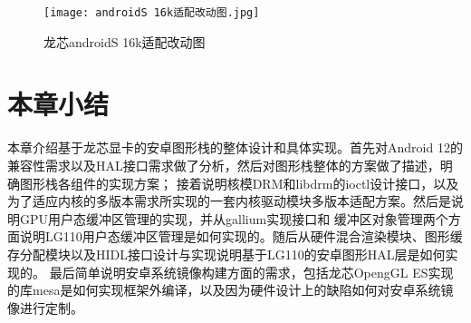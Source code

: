 \begin{figure}[h]
  \centering
  \texttt{[image: androidS 16k适配改动图.jpg]}
  \caption{龙芯androidS 16k适配改动图}
  \label{fig:androidS 16k适配改动图}
\end{figure}


\section{本章小结}
本章介绍基于龙芯显卡的安卓图形栈的整体设计和具体实现。首先对Android 12的兼容性需求以及HAL接口需求做了分析，然后对图形栈整体的方案做了描述，明确图形栈各组件的实现方案；
接着说明核模DRM和libdrm的ioctl设计接口，以及为了适应内核的多版本需求所实现的一套内核驱动模块多版本适配方案。然后是说明GPU用户态缓冲区管理的实现，并从gallium实现接口和
缓冲区对象管理两个方面说明LG110用户态缓冲区管理是如何实现的。随后从硬件混合渲染模块、图形缓存分配模块以及HIDL接口设计与实现说明基于LG110的安卓图形HAL层是如何实现的。
最后简单说明安卓系统镜像构建方面的需求，包括龙芯OpengGL ES实现的库mesa是如何实现框架外编译，以及因为硬件设计上的缺陷如何对安卓系统镜像进行定制。



